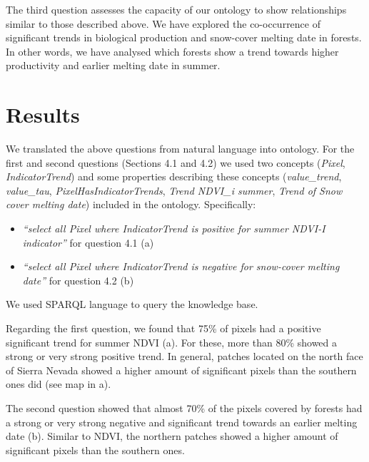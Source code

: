 The third question assesses the capacity of our ontology to show relationships similar to those described above. We have explored the co-occurrence of significant trends in biological production and snow-cover melting date in \Qp forests. In other words, we have analysed which \Qp forests show a trend towards higher productivity and earlier melting date in summer.

\section{Results}\label{sec:onto:Results}

We translated the above questions from natural language into ontology. For the first and second questions (Sections 4.1 and 4.2) we used two concepts (\emph{Pixel}, \emph{IndicatorTrend}) and some properties describing these concepts (\emph{value\_trend}, \emph{value\_tau}, \emph{PixelHasIndicatorTrends}, \emph{Trend NDVI\_i summer}, \emph{Trend of Snow cover melting date}) included in the ontology. Specifically:

\begin{itemize}
\item
  \emph{``select all Pixel where IndicatorTrend is positive for summer NDVI-I indicator''} for question 4.1 (a)
\item
  \emph{``select all Pixel where IndicatorTrend is negative for snow-cover melting date''} for question 4.2 (b)
\end{itemize}

We used SPARQL language to query the knowledge base.

Regarding the first question, we found that 75\% of pixels had a positive significant trend for summer NDVI (a). For these, more than 80\% showed a strong or very strong positive trend. In general, \Qp patches located on the north face of Sierra Nevada showed a higher amount of significant pixels than the southern ones did (see map in a).

The second question showed that almost 70\% of the pixels covered by \Qp forests had a strong or very strong negative and significant trend towards an earlier melting date (b). Similar to NDVI, the northern patches showed a higher amount of significant pixels than the southern ones.

